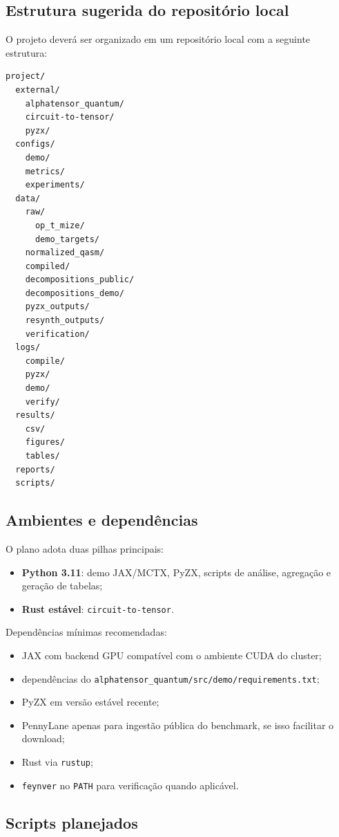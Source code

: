 \documentclass[a4paper,11pt]{article}
\begin{document}
\subsection*{Estrutura sugerida do repositório local}

O projeto deverá ser organizado em um repositório local com a seguinte estrutura:

\begin{verbatim}
project/
  external/
    alphatensor_quantum/
    circuit-to-tensor/
    pyzx/
  configs/
    demo/
    metrics/
    experiments/
  data/
    raw/
      op_t_mize/
      demo_targets/
    normalized_qasm/
    compiled/
    decompositions_public/
    decompositions_demo/
    pyzx_outputs/
    resynth_outputs/
    verification/
  logs/
    compile/
    pyzx/
    demo/
    verify/
  results/
    csv/
    figures/
    tables/
  reports/
  scripts/
\end{verbatim}

\subsection*{Ambientes e dependências}

O plano adota duas pilhas principais:
\begin{itemize}
  \item \textbf{Python 3.11}: demo JAX/MCTX, PyZX, scripts de análise, agregação e geração de tabelas;
  \item \textbf{Rust estável}: \texttt{circuit-to-tensor}.
\end{itemize}

Dependências mínimas recomendadas:
\begin{itemize}
  \item JAX com backend GPU compatível com o ambiente CUDA do cluster;
  \item dependências do \texttt{alphatensor\_quantum/src/demo/requirements.txt};
  \item PyZX em versão estável recente;
  \item PennyLane apenas para ingestão pública do benchmark, se isso facilitar o download;
  \item Rust via \texttt{rustup};
  \item \texttt{feynver} no \texttt{PATH} para verificação quando aplicável.
\end{itemize}

\subsection*{Scripts planejados}
\end{document}
